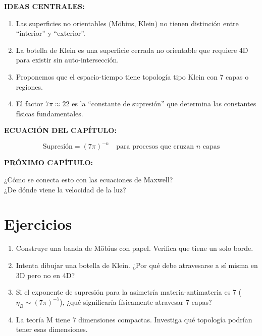 \begin{tcolorbox}[colback=kleingray, colframe=kleinblue, title=\textbf{Resumen del Capítulo 2}]

\textbf{IDEAS CENTRALES:}

\begin{enumerate}
    \item Las superficies no orientables (Möbius, Klein) no tienen
    distinción entre ``interior'' y ``exterior''.

    \item La botella de Klein es una superficie cerrada no orientable
    que requiere 4D para existir sin auto-intersección.

    \item Proponemos que el espacio-tiempo tiene topología tipo Klein
    con 7 capas o regiones.

    \item El factor $7\pi \approx 22$ es la ``constante de supresión'' que
    determina las constantes físicas fundamentales.
\end{enumerate}

\vspace{0.3cm}
\textbf{ECUACIÓN DEL CAPÍTULO:}

\begin{equation}
\boxed{\text{Supresión} = (7\pi)^{-n} \quad \text{para procesos que cruzan } n \text{ capas}}
\end{equation}

\vspace{0.3cm}
\textbf{PRÓXIMO CAPÍTULO:}

¿Cómo se conecta esto con las ecuaciones de Maxwell?\\
¿De dónde viene la velocidad de la luz?

\end{tcolorbox}


\section*{Ejercicios}

\begin{enumerate}
    \item Construye una banda de Möbius con papel. Verifica que tiene un solo borde.

    \item Intenta dibujar una botella de Klein. ¿Por qué debe atravesarse a sí misma
    en 3D pero no en 4D?

    \item Si el exponente de supresión para la asimetría materia-antimateria es 7
    ($\eta_B \sim (7\pi)^{-7}$), ¿qué significaría físicamente atravesar 7 capas?

    \item La teoría M tiene 7 dimensiones compactas. Investiga qué topología
    podrían tener esas dimensiones.
\end{enumerate}


